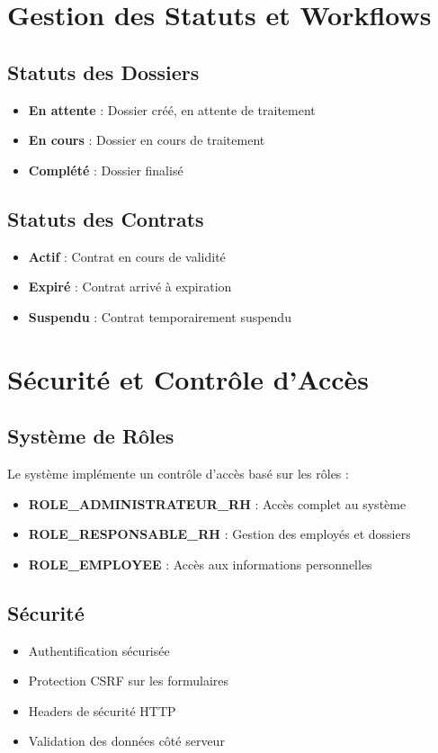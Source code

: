 \documentclass[12pt,a4paper]{article}
\begin{document}
\section{Gestion des Statuts et Workflows}

\subsection{Statuts des Dossiers}
\begin{itemize}
    \item \textbf{En attente} : Dossier créé, en attente de traitement
    \item \textbf{En cours} : Dossier en cours de traitement
    \item \textbf{Complété} : Dossier finalisé
\end{itemize}

\subsection{Statuts des Contrats}
\begin{itemize}
    \item \textbf{Actif} : Contrat en cours de validité
    \item \textbf{Expiré} : Contrat arrivé à expiration
    \item \textbf{Suspendu} : Contrat temporairement suspendu
\end{itemize}

\section{Sécurité et Contrôle d'Accès}

\subsection{Système de Rôles}
Le système implémente un contrôle d'accès basé sur les rôles :
\begin{itemize}
    \item \textbf{ROLE\_ADMINISTRATEUR\_RH} : Accès complet au système
    \item \textbf{ROLE\_RESPONSABLE\_RH} : Gestion des employés et dossiers
    \item \textbf{ROLE\_EMPLOYEE} : Accès aux informations personnelles
\end{itemize}

\subsection{Sécurité}
\begin{itemize}
    \item Authentification sécurisée
    \item Protection CSRF sur les formulaires
    \item Headers de sécurité HTTP
    \item Validation des données côté serveur
\end{itemize}
\end{document}
